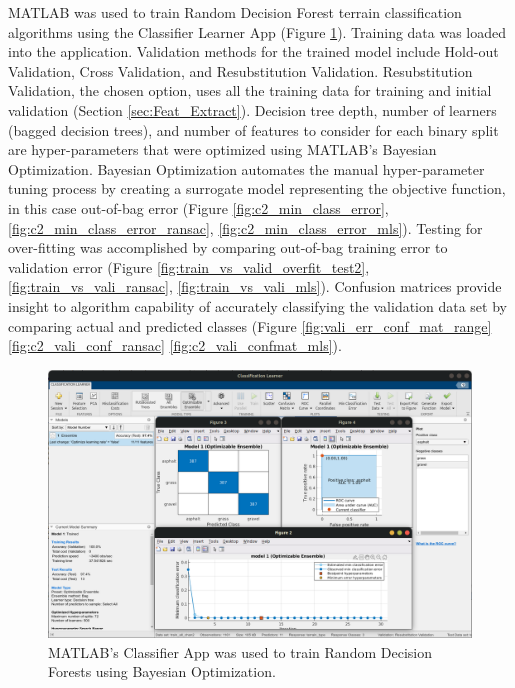 \documentclass[numbered,pdftex]{ohio-etd}
\begin{document}
{{		{MATLAB was used to train Random Decision Forest terrain classification algorithms using the Classifier Learner App (Figure \ref{fig:classifier_app}). Training data was loaded into the application. Validation methods for the trained model include Hold-out Validation, Cross Validation, and Resubstitution Validation. Resubstitution Validation, the chosen option, uses all the training data for training and initial validation (Section \ref{sec:Feat_Extract}). Decision tree depth, number of learners (bagged decision trees), and number of features to consider for each binary split are hyper-parameters that were optimized using MATLAB's Bayesian Optimization. Bayesian Optimization automates the manual hyper-parameter tuning process by creating a surrogate model representing the objective function, in this case out-of-bag error (Figure \ref{fig:c2_min_class_error}, \ref{fig:c2_min_class_error_ransac}, \ref{fig:c2_min_class_error_mls}). Testing for over-fitting was accomplished by comparing out-of-bag training error to validation error (Figure \ref{fig:train_vs_valid_overfit_test2}, \ref{fig:train_vs_vali_ransac}, \ref{fig:train_vs_vali_mls}). Confusion matrices provide insight to algorithm capability of accurately classifying the validation data set by comparing  actual and predicted classes (Figure \ref{fig:vali_err_conf_mat_range} \ref{fig:c2_vali_conf_ransac} \ref{fig:c2_vali_confmat_mls}).} 
		
		\begin{figure}[H]
			\centering
			\includegraphics[width=0.9\linewidth]{Defense_Images/classifier_app_2}
			\caption[Classifier App]{MATLAB's Classifier App was used to train Random Decision Forests using Bayesian Optimization. }
			\label{fig:classifier_app}
		\end{figure}
		
}}
\end{document}
